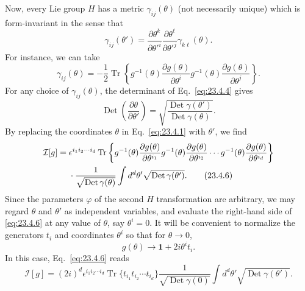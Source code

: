 Now, every Lie group $H$ has a metric $\gamma_{ij}(\theta)$ (not
necessarily unique) which is form-invariant in the sense that
\begin{equation}
\gamma_{ij}(\theta')
=\frac{\partial\theta^k}{\partial\theta'^i}
\frac{\partial\theta^\ell}{\partial\theta'^j}
\gamma_{k\ell}(\theta).
\tag{23.4.4}\label{eq:23.4.4}
\end{equation}
For instance, we can take
\begin{equation}
\gamma_{ij}(\theta)=-\frac12\operatorname{Tr}\left\{
g^{-1}(\theta)\frac{\partial g(\theta)}{\partial\theta^i}
g^{-1}(\theta)\frac{\partial g(\theta)}{\partial\theta^j}
\right\}.
\tag{23.4.5}\label{eq:23.4.5}
\end{equation}
For any choice of $\gamma_{ij}(\theta)$, the determinant of
Eq.~\eqref{eq:23.4.4} gives
\[
\operatorname{Det}\left(\frac{\partial\theta}{\partial\theta'}\right)
=\sqrt{\frac{\operatorname{Det}\gamma(\theta')}
{\operatorname{Det}\gamma(\theta)}}.
\]
By replacing the coordinates $\theta$ in Eq.~\eqref{eq:23.4.1} with
$\theta'$, we find
\begin{align}
\mathcal I[g]={}&
\epsilon^{i_1i_2\cdots i_d}\operatorname{Tr}\left\{
g^{-1}(\theta)\frac{\partial g(\theta)}{\partial\theta^{i_1}}
g^{-1}(\theta)\frac{\partial g(\theta)}{\partial\theta^{i_2}}
\cdots
g^{-1}(\theta)\frac{\partial g(\theta)}{\partial\theta^{i_d}}
\right\}
\notag\\
&{}\cdot\frac{1}{\sqrt{\operatorname{Det}\gamma(\theta)}}
\int d^d\theta'\sqrt{\operatorname{Det}\gamma(\theta')}.
\tag{23.4.6}\label{eq:23.4.6}
\end{align}
Since the parameters $\varphi$ of the second $H$ transformation are
arbitrary, we may regard $\theta$ and $\theta'$ as independent variables,
and evaluate the right-hand side of \eqref{eq:23.4.6} at any value of
$\theta$, say $\theta^i=0$. It will be convenient to normalize the
generators $t_i$ and coordinates $\theta^i$ so that for $\theta\to0$,
\begin{equation}
g(\theta)\longrightarrow \mathbf{1}+2i\theta^it_i.
\tag{23.4.7}\label{eq:23.4.7}
\end{equation}
In this case, Eq.~\eqref{eq:23.4.6} reads
\begin{equation}
\mathcal I[g]=(2i)^d\epsilon^{i_1i_2\cdots i_d}
\operatorname{Tr}\{t_{i_1}t_{i_2}\cdots t_{i_d}\}
\frac{1}{\sqrt{\operatorname{Det}\gamma(0)}}
\int d^d\theta'\sqrt{\operatorname{Det}\gamma(\theta')}.
\tag{23.4.8}\label{eq:23.4.8}
\end{equation}

